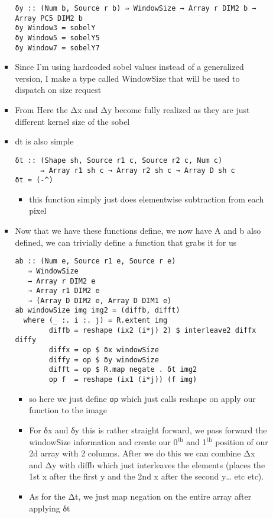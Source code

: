 \documentclass{article}
\begin{document}
\begin{enumerate}
\begin{enumerate}
\begin{itemize}
\begin{verbatim}
δy :: (Num b, Source r b) ⇒ WindowSize → Array r DIM2 b → Array PC5 DIM2 b
δy Window3 = sobelY
δy Window5 = sobelY5
δy Window7 = sobelY7
\end{verbatim}
\item Since I'm using hardcoded sobel values instead of a generalized
version, I make a type called WindowSize that will be used to
dispatch on size request
\item From Here the Δx and Δy become fully realized as they are just
different kernel size of the sobel
\item dt is also simple
\begin{verbatim}
δt :: (Shape sh, Source r1 c, Source r2 c, Num c)
      ⇒ Array r1 sh c → Array r2 sh c → Array D sh c
δt = (-^)
\end{verbatim}
\begin{itemize}
\item this function simply just does elementwise subtraction from each pixel
\end{itemize}
\item Now that we have these functions define, we now have A and b also
defined, we can trivially define a function that grabs it for us
\begin{verbatim}
ab :: (Num e, Source r1 e, Source r e)
   ⇒ WindowSize
   → Array r DIM2 e
   → Array r1 DIM2 e
   → (Array D DIM2 e, Array D DIM1 e)
ab windowSize img img2 = (diffb, difft)
  where (_ :. i :. j) = R.extent img
        diffb = reshape (ix2 (i*j) 2) $ interleave2 diffx diffy
        diffx = op $ δx windowSize
        diffy = op $ δy windowSize
        difft = op $ R.map negate . δt img2
        op f  = reshape (ix1 (i*j)) (f img)
\end{verbatim}
\begin{itemize}
\item so here we just define \texttt{op} which just calls reshape on apply our
function to the image

\item For δx and δy this is rather straight forward, we pass forward the
windowSize information and create our 0$^{\text{th}}$ and 1$^{\text{th}}$ position of our
2d array with 2 columns. After we do this we can combine Δx and Δy
with diffb which just interleaves the elements (places the 1st x
after the first y and the 2nd x after the second y\ldots{} etc etc).

\item As for the Δt, we just map negation on the entire array after
applying δt
\end{itemize}
\end{itemize}
\end{enumerate}
\end{enumerate}
\end{document}
